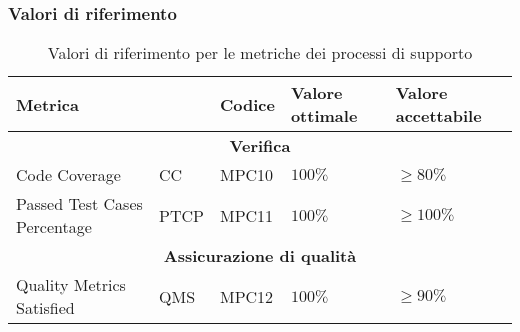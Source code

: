 \subsubsection{Valori di riferimento}
\begin{table}[H]
	\centering
	\begin{tabularx}{\textwidth}{p{3.5cm}|X|X|l|l}
		\hline
		\multicolumn{2}{l|}{\textbf{Metrica}} & \textbf{Codice} & \textbf{Valore ottimale} & \textbf{Valore accettabile}               \\
		\hline
		\multicolumn{5}{c}{\textbf{Verifica}}                                                                                          \\
		\hline
		Code Coverage                         & CC              & MPC10                    & $100\%$                     & $\ge 80\%$  \\
		Passed Test Cases Percentage          & PTCP            & MPC11                    & $100\%$                     & $\ge 100\%$ \\
		\hline
		\multicolumn{5}{c}{\textbf{Assicurazione di qualità}}                                                                          \\
		\hline
		Quality Metrics Satisfied             & QMS             & MPC12                    & $100\%$                     & $\ge 90\%$  \\
		\hline
	\end{tabularx}
	\caption{Valori di riferimento per le metriche dei processi di supporto}
\end{table}
